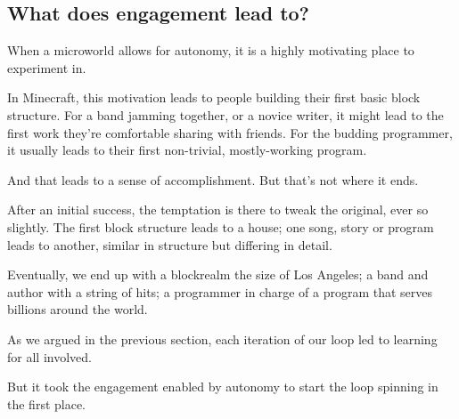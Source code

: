 \subsection{What does engagement lead to?}

When a microworld allows for autonomy, it is a highly motivating place
to experiment in.

In Minecraft, this motivation leads to people building their first basic
block structure. For a band jamming together, or a novice writer, it
might lead to the first work they're comfortable sharing with friends.
For the budding programmer, it usually leads to their first non-trivial,
mostly-working program.

And that leads to a sense of accomplishment. But that's not where it
ends.

After an initial success, the temptation is there to tweak the original,
ever so slightly. The first block structure leads to a house; one song,
story or program leads to another, similar in structure but differing in
detail.

Eventually, we end up with a blockrealm the size of Los Angeles; a band
and author with a string of hits; a programmer in charge of a program
that serves billions around the world.

As we argued in the previous section, each iteration of our loop led to
learning for all involved.

But it took the engagement enabled by autonomy to start the loop
spinning in the first place.

